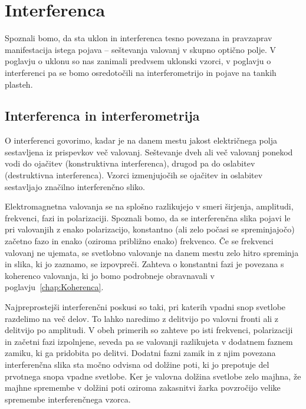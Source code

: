 
\chapter{Interferenca}
\label{chap:Interferenca}
Spoznali bomo, da sta uklon in interferenca tesno povezana in pravzaprav
manifestacija istega pojava -- seštevanja  valovanj v 
skupno optično polje. V poglavju o uklonu so nas zanimali predvsem uklonski 
vzorci, v poglavju o interferenci pa se bomo osredotočili na interferometrijo 
in pojave na tankih plasteh.

\section{Interferenca in interferometrija}
O interferenci govorimo, kadar je na danem mestu jakost električnega polja 
sestavljena iz prispevkov več valovanj. Seštevanje 
dveh ali več valovanj ponekod vodi
do ojačitev (konstruktivna interferenca), 
drugod pa do oslabitev (destruktivna interferenca). 
Vzorci izmenjujočih se ojačitev in oslabitev sestavljajo
značilno interferenčno sliko.

Elektromagnetna valovanja se na splošno razlikujejo 
v smeri širjenja, amplitudi, frekvenci, fazi in polarizaciji. 
Spoznali bomo, da se interferenčna slika pojavi le pri valovanjih z enako
polarizacijo, konstantno (ali zelo počasi se spreminjajočo)
začetno fazo in enako (oziroma približno enako) frekvenco. 
Če se frekvenci valovanj ne ujemata, se svetlobno valovanje na 
danem mestu zelo hitro spreminja in slika, ki jo zaznamo, se izpovpreči.
Zahteva o konstantni fazi je povezana s koherenco valovanja, 
ki jo bomo podrobneje obravnavali v poglavju~\ref{chap:Koherenca}. 

Najpreprostejši interferenčni poskusi so taki, pri katerih vpadni snop svetlobe
razdelimo na več delov. To lahko naredimo z delitvijo po valovni fronti
ali z delitvijo po amplitudi. V obeh primerih so zahteve po isti frekvenci, 
polarizaciji in začetni fazi izpolnjene, seveda pa se valovanji razlikujeta 
v dodatnem faznem zamiku, ki ga pridobita po delitvi.
Dodatni fazni zamik in z njim povezana interferenčna slika 
sta močno odvisna od dolžine poti, ki jo prepotuje del prvotnega snopa 
vpadne svetlobe. Ker je valovna dolžina svetlobe zelo majhna, že majhne 
spremembe v dolžini poti oziroma zakasnitvi žarka povzročijo velike spremembe 
interferenčnega vzorca. 

